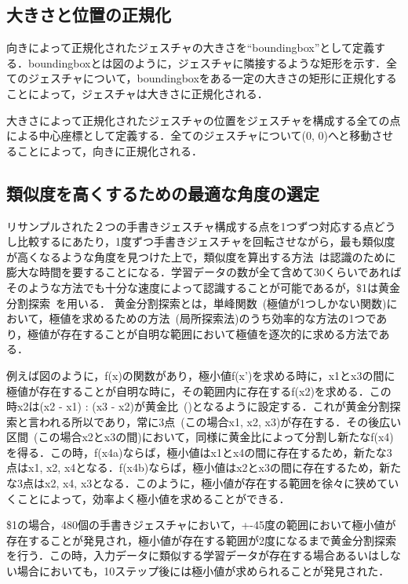 \subsection{大きさと位置の正規化}
向きによって正規化されたジェスチャの大きさを``boundingbox''として定義する．boundingboxとは図のように，ジェスチャに隣接するような矩形を示す．全てのジェスチャについて，boundingboxをある一定の大きさの矩形に正規化することによって，ジェスチャは大きさに正規化される．

大きさによって正規化されたジェスチャの位置をジェスチャを構成する全ての点による中心座標として定義する．全てのジェスチャについて(0, 0)へと移動させることによって，向きに正規化される．

\subsection{類似度を高くするための最適な角度の選定}
リサンプルされた２つの手書きジェスチャ構成する点を1つずつ対応する点どうし比較するにあたり，1度ずつ手書きジェスチャを回転させながら，最も類似度が高くなるような角度を見つけた上で，類似度を算出する方法~\cite{Kara:2005:ITS:1652319.1652712}は認識のために膨大な時間を要することになる．学習データの数が全て含めて30くらいであればそのような方法でも十分な速度によって認識することが可能であるが，\$1は黄金分割探索~\cite{Press:1992:NRC:148286}を用いる．
黄金分割探索とは，単峰関数~(極値が1つしかない関数)において，極値を求めるための方法~(局所探索法)のうち効率的な方法の1つであり，極値が存在することが自明な範囲において極値を逐次的に求める方法である．

例えば図のように，f(x)の関数があり，極小値f(x')を求める時に，x1とx3の間に極値が存在することが自明な時に，その範囲内に存在するf(x2)を求める．この時x2は(x2 - x1) : (x3 - x2)が黄金比~()となるように設定する．これが黄金分割探索と言われる所以であり，常に3点~(この場合x1, x2, x3)が存在する．その後広い区間~(この場合x2とx3の間)において，同様に黄金比によって分割し新たなf(x4)を得る．この時，f(x4a)ならば，極小値はx1とx4の間に存在するため，新たな3点はx1, x2, x4となる．f(x4b)ならば，極小値はx2とx3の間に存在するため，新たな3点はx2, x4, x3となる．このように，極小値が存在する範囲を徐々に狭めていくことによって，効率よく極小値を求めることができる．

\$1の場合，480個の手書きジェスチャにおいて，+-45度の範囲において極小値が存在することが発見され，極小値が存在する範囲が2度になるまで黄金分割探索を行う．この時，入力データに類似する学習データが存在する場合あるいはしない場合においても，10ステップ後には極小値が求められることが発見された．

